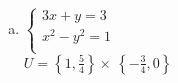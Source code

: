 \documentclass[a4paper,14pt]{article}
\begin{document}
\begin{multicols}{2}
\begin{enumerate}
\begin{enumerate}[a)]
                \item $
                \begin{cases}
                	3x + y = 3 \\
                	x^2 - y^2 = 1 \\
                \end{cases}$ \\
                $U = \left\{1,\frac{5}{4}\right\} \times\ \left\{-\frac{3}{4},0\right\} $
            \end{enumerate}
	    \end{enumerate}
    $~$ \\ $~$ \\ $~$ \\ $~$ \\ $~$ \\ $~$ \\ $~$ \\ $~$ \\ $~$ \\ $~$ \\ $~$ \\ $~$ \\ $~$ \\ $~$ \\ $~$ \\ $~$ \\ $~$ \\ $~$ \\ $~$ \\ $~$ \\ $~$ \\ $~$ \\ $~$ \\ $~$ \\ $~$ \\ $~$ \\ $~$
    \end{multicols}
\end{document}

